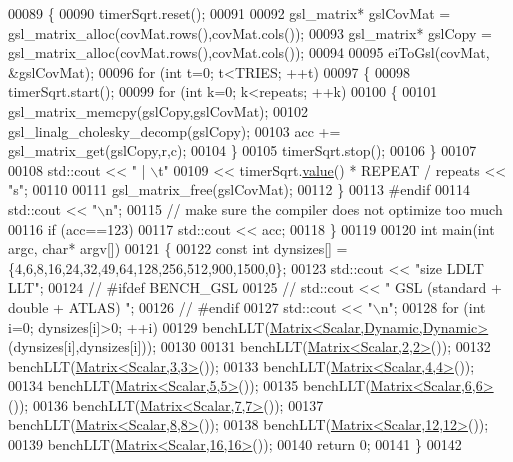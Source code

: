 \begin{DoxyCode}
00089   \{
00090     timerSqrt.reset();
00091 
00092     gsl\_matrix* gslCovMat = gsl\_matrix\_alloc(covMat.rows(),covMat.cols());
00093     gsl\_matrix* gslCopy = gsl\_matrix\_alloc(covMat.rows(),covMat.cols());
00094 
00095     eiToGsl(covMat, &gslCovMat);
00096     \textcolor{keywordflow}{for} (\textcolor{keywordtype}{int} t=0; t<TRIES; ++t)
00097     \{
00098       timerSqrt.start();
00099       \textcolor{keywordflow}{for} (\textcolor{keywordtype}{int} k=0; k<repeats; ++k)
00100       \{
00101         gsl\_matrix\_memcpy(gslCopy,gslCovMat);
00102         gsl\_linalg\_cholesky\_decomp(gslCopy);
00103         acc += gsl\_matrix\_get(gslCopy,r,c);
00104       \}
00105       timerSqrt.stop();
00106     \}
00107 
00108     std::cout << \textcolor{stringliteral}{" | \(\backslash\)t"}
00109               << timerSqrt.\hyperlink{class_eigen_1_1_bench_timer_a26760f963ed8b64c126159bfea57735e}{value}() * REPEAT / repeats << \textcolor{stringliteral}{"s"};
00110 
00111     gsl\_matrix\_free(gslCovMat);
00112   \}
00113 \textcolor{preprocessor}{  #endif}
00114   std::cout << \textcolor{stringliteral}{"\(\backslash\)n"};
00115   \textcolor{comment}{// make sure the compiler does not optimize too much}
00116   \textcolor{keywordflow}{if} (acc==123)
00117     std::cout << acc;
00118 \}
00119 
00120 \textcolor{keywordtype}{int} main(\textcolor{keywordtype}{int} argc, \textcolor{keywordtype}{char}* argv[])
00121 \{
00122   \textcolor{keyword}{const} \textcolor{keywordtype}{int} dynsizes[] = \{4,6,8,16,24,32,49,64,128,256,512,900,1500,0\};
00123   std::cout << \textcolor{stringliteral}{"size            LDLT                            LLT"};
00124 \textcolor{comment}{//   #ifdef BENCH\_GSL}
00125 \textcolor{comment}{//   std::cout << "       GSL (standard + double + ATLAS)  ";}
00126 \textcolor{comment}{//   #endif}
00127   std::cout << \textcolor{stringliteral}{"\(\backslash\)n"};
00128   \textcolor{keywordflow}{for} (\textcolor{keywordtype}{int} i=0; dynsizes[i]>0; ++i)
00129     benchLLT(\hyperlink{group___core___module}{Matrix<Scalar,Dynamic,Dynamic>}(dynsizes[i],dynsizes[i]));
00130 
00131   benchLLT(\hyperlink{group___core___module_class_eigen_1_1_matrix}{Matrix<Scalar,2,2>}());
00132   benchLLT(\hyperlink{group___core___module_class_eigen_1_1_matrix}{Matrix<Scalar,3,3>}());
00133   benchLLT(\hyperlink{group___core___module_class_eigen_1_1_matrix}{Matrix<Scalar,4,4>}());
00134   benchLLT(\hyperlink{group___core___module_class_eigen_1_1_matrix}{Matrix<Scalar,5,5>}());
00135   benchLLT(\hyperlink{group___core___module_class_eigen_1_1_matrix}{Matrix<Scalar,6,6>}());
00136   benchLLT(\hyperlink{group___core___module_class_eigen_1_1_matrix}{Matrix<Scalar,7,7>}());
00137   benchLLT(\hyperlink{group___core___module_class_eigen_1_1_matrix}{Matrix<Scalar,8,8>}());
00138   benchLLT(\hyperlink{group___core___module_class_eigen_1_1_matrix}{Matrix<Scalar,12,12>}());
00139   benchLLT(\hyperlink{group___core___module_class_eigen_1_1_matrix}{Matrix<Scalar,16,16>}());
00140   \textcolor{keywordflow}{return} 0;
00141 \}
00142 
\end{DoxyCode}
